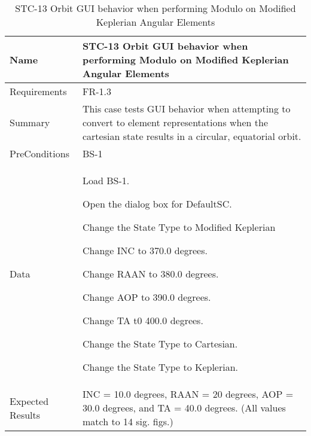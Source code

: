 
\begin{table}[htbp!]
\centering
      \begin{tabular}{|p{1.05 in} |p{4.75 in} |}
      \hline
         \rowcolor[rgb]{0.8,0.8,0.8} Name & STC-13 Orbit GUI behavior when performing Modulo on Modified Keplerian Angular Elements\\
         \hline
         Requirements & FR-1.3\\  \hline
         Summary &
         This  case tests GUI behavior when attempting to convert to element representations when the
         cartesian state results in a circular, equatorial orbit.
         \\     \hline
         PreConditions & BS-1\\     \hline
         Data &
         \begin{compactenum}
             \item Load BS-1.
             \item Open the dialog box for DefaultSC.
             \item Change the State Type to Modified Keplerian
             \item Change INC to 370.0 degrees.
             \item Change RAAN to 380.0 degrees.
             \item Change AOP to 390.0 degrees.
             \item Change TA t0 400.0 degrees.
             \item Change the State Type to Cartesian.
             \item Change the State Type to Keplerian.
         \end{compactenum}
         \\ \hline
         Expected Results & INC = 10.0 degrees, RAAN = 20 degrees, AOP = 30.0 degrees, and TA = 40.0 degrees. (All
         values match to 14 sig. figs.)\\
      \hline
      \end{tabular}
      \label{Table:STC-13}
      \caption{STC-13 Orbit GUI behavior when performing Modulo on Modified Keplerian Angular Elements}
\end{table} 